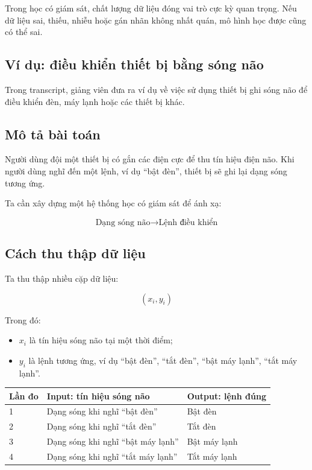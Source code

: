 \begin{ghinho}
Trong học có giám sát, chất lượng dữ liệu đóng vai trò cực kỳ quan trọng. Nếu dữ liệu sai, thiếu, nhiễu hoặc gán nhãn không nhất quán, mô hình học được cũng có thể sai.
\end{ghinho}

\subsection{Ví dụ: điều khiển thiết bị bằng sóng não}

Trong transcript, giảng viên đưa ra ví dụ về việc sử dụng thiết bị ghi sóng não để điều khiển đèn, máy lạnh hoặc các thiết bị khác.

\subsection{Mô tả bài toán}

Người dùng đội một thiết bị có gắn các điện cực để thu tín hiệu điện não. Khi người dùng nghĩ đến một lệnh, ví dụ ``bật đèn'', thiết bị sẽ ghi lại dạng sóng tương ứng.

Ta cần xây dựng một hệ thống học có giám sát để ánh xạ:

\[
    \text{Dạng sóng não} \longrightarrow \text{Lệnh điều khiển}
\]

\subsection{Cách thu thập dữ liệu}

Ta thu thập nhiều cặp dữ liệu:

\[
    (x_i, y_i)
\]

Trong đó:

\begin{itemize}
    \item $x_i$ là tín hiệu sóng não tại một thời điểm;
    \item $y_i$ là lệnh tương ứng, ví dụ ``bật đèn'', ``tắt đèn'', ``bật máy lạnh'', ``tắt máy lạnh''.
\end{itemize}

\begin{center}
\begin{tabular}{lll}
\toprule
Lần đo & Input: tín hiệu sóng não & Output: lệnh đúng \\
\midrule
1 & Dạng sóng khi nghĩ ``bật đèn'' & Bật đèn \\
2 & Dạng sóng khi nghĩ ``tắt đèn'' & Tắt đèn \\
3 & Dạng sóng khi nghĩ ``bật máy lạnh'' & Bật máy lạnh \\
4 & Dạng sóng khi nghĩ ``tắt máy lạnh'' & Tắt máy lạnh \\
\bottomrule
\end{tabular}
\end{center}

